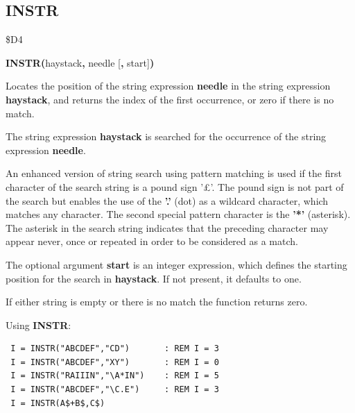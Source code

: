 \subsection{INSTR}
\begin{description}[leftmargin=2cm,style=nextline]
\item [Token:] \$D4
\item [Format:] {\bf INSTR(}haystack{\bf,} needle [{\bf,} start]{\bf)}
\item [Usage:] Locates the
               position of the string expression {\bf needle}
               in the string expression {\bf haystack}, and
               returns the index of the first occurrence,
               or zero if there is no match.

               The string expression {\bf haystack}
               is searched for the occurrence of the
               string expression
               {\bf needle}.

               An enhanced version of string search using pattern
               matching is used if the first character of
               the search string is a pound sign '£'.
               The pound sign is not part of the search but enables the use
               of the {\bf '.'} (dot) as a wildcard character, which matches any
               character. The second special pattern character is
               the {\bf '*'} (asterisk). The asterisk in the search string indicates
               that the preceding character may appear never, once or repeated
               in order to be considered as a match.

               The optional argument {\bf start} is an integer
               expression, which defines the starting position
               for the search in {\bf haystack}. If not present,
               it defaults to one.

\item [Remarks:] If either string is empty or there is no match
               the function returns zero.

\item [Examples:] Using {\bf INSTR}:
\begin{tcolorbox}[colback=black,coltext=white]
\verbatimfont{\codefont}
\begin{verbatim}
 I = INSTR("ABCDEF","CD")       : REM I = 3
 I = INSTR("ABCDEF","XY")       : REM I = 0
 I = INSTR("RAIIIN","\A*IN")    : REM I = 5
 I = INSTR("ABCDEF","\C.E")     : REM I = 3
 I = INSTR(A$+B$,C$)
\end{verbatim}
\end{tcolorbox}
\end{description}

